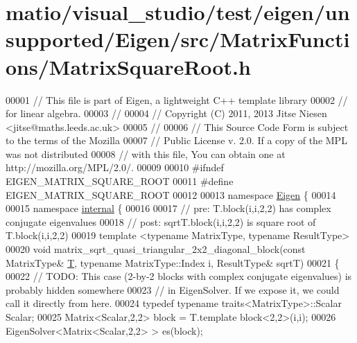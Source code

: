 \hypertarget{matio_2visual__studio_2test_2eigen_2unsupported_2_eigen_2src_2_matrix_functions_2_matrix_square_root_8h_source}{}\section{matio/visual\+\_\+studio/test/eigen/unsupported/\+Eigen/src/\+Matrix\+Functions/\+Matrix\+Square\+Root.h}
\label{matio_2visual__studio_2test_2eigen_2unsupported_2_eigen_2src_2_matrix_functions_2_matrix_square_root_8h_source}

\begin{DoxyCode}
00001 \textcolor{comment}{// This file is part of Eigen, a lightweight C++ template library}
00002 \textcolor{comment}{// for linear algebra.}
00003 \textcolor{comment}{//}
00004 \textcolor{comment}{// Copyright (C) 2011, 2013 Jitse Niesen <jitse@maths.leeds.ac.uk>}
00005 \textcolor{comment}{//}
00006 \textcolor{comment}{// This Source Code Form is subject to the terms of the Mozilla}
00007 \textcolor{comment}{// Public License v. 2.0. If a copy of the MPL was not distributed}
00008 \textcolor{comment}{// with this file, You can obtain one at http://mozilla.org/MPL/2.0/.}
00009 
00010 \textcolor{preprocessor}{#ifndef EIGEN\_MATRIX\_SQUARE\_ROOT}
00011 \textcolor{preprocessor}{#define EIGEN\_MATRIX\_SQUARE\_ROOT}
00012 
00013 \textcolor{keyword}{namespace }\hyperlink{namespace_eigen}{Eigen} \{ 
00014 
00015 \textcolor{keyword}{namespace }\hyperlink{namespaceinternal}{internal} \{
00016 
00017 \textcolor{comment}{// pre:  T.block(i,i,2,2) has complex conjugate eigenvalues}
00018 \textcolor{comment}{// post: sqrtT.block(i,i,2,2) is square root of T.block(i,i,2,2)}
00019 \textcolor{keyword}{template} <\textcolor{keyword}{typename} MatrixType, \textcolor{keyword}{typename} ResultType>
00020 \textcolor{keywordtype}{void} matrix\_sqrt\_quasi\_triangular\_2x2\_diagonal\_block(\textcolor{keyword}{const} MatrixType& \hyperlink{group___sparse_core___module_class_eigen_1_1_triplet}{T}, \textcolor{keyword}{typename} MatrixType::Index i, 
      ResultType& sqrtT)
00021 \{
00022   \textcolor{comment}{// TODO: This case (2-by-2 blocks with complex conjugate eigenvalues) is probably hidden somewhere}
00023   \textcolor{comment}{//       in EigenSolver. If we expose it, we could call it directly from here.}
00024   \textcolor{keyword}{typedef} \textcolor{keyword}{typename} traits<MatrixType>::Scalar Scalar;
00025   Matrix<Scalar,2,2> block = T.template block<2,2>(i,i);
00026   EigenSolver<Matrix<Scalar,2,2> > es(block);

\end{DoxyCode}
